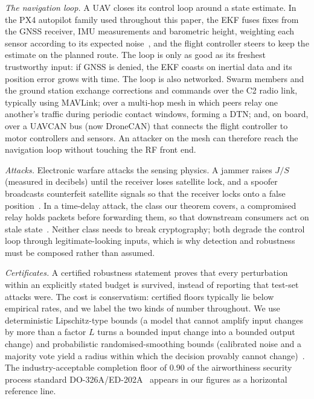\documentclass[conference,letterpaper,10pt]{IEEEtran}   %
\begin{document}
\emph{The navigation loop.} A UAV closes its control loop around a state
estimate. In the PX4 autopilot family used throughout this paper, the EKF
fuses fixes from the GNSS receiver, IMU measurements and barometric height,
weighting
each sensor according to its expected noise~\cite{kong2024px4ekf}, and the
flight controller steers to keep the estimate on the planned route. The loop is
only as good as its freshest trustworthy input: if GNSS is denied, the EKF
coasts on inertial data and its position error grows with time. The loop is
also networked. Swarm members and the ground station exchange corrections and
commands over the C2 radio link, typically using MAVLink;
over a multi-hop mesh in which peers relay one another's traffic during
periodic contact windows, forming a DTN; and, on board,
over a UAVCAN bus (now DroneCAN) that connects the flight controller to motor
controllers and sensors. An attacker on the mesh can therefore reach the
navigation loop without touching the RF front end.

\emph{Attacks.} Electronic warfare attacks the sensing physics. A jammer
raises $J/S$ (measured in decibels) until the
receiver loses satellite lock, and a spoofer broadcasts counterfeit satellite
signals so that the receiver locks onto a false
position~\cite{humphreys2008assessing,kerns2014capture}. In a time-delay
attack, the class our theorem covers, a compromised relay holds packets before
forwarding them, so that downstream consumers act on stale
state~\cite{lou2019timedelay,datamut2026}. Neither class needs to break
cryptography; both degrade the control loop through legitimate-looking inputs,
which is why detection and robustness must be composed rather than assumed.

\emph{Certificates.} A certified robustness statement proves that every
perturbation within an explicitly stated budget is survived, instead of
reporting that test-set attacks were. The cost is conservatism: certified
floors typically lie below empirical rates, and we label the two kinds of
number throughout. We use deterministic Lipschitz-type bounds (a model that
cannot amplify input changes by more than a factor $L$ turns a bounded input
change into a bounded output change) and probabilistic randomised-smoothing
bounds (calibrated noise and a majority vote yield a radius within which the
decision provably cannot change)~\cite{cohen2019smoothing}. The
industry-acceptable completion floor of $0.90$ of the airworthiness security
process standard DO-326A/ED-202A~\cite{do326a} appears in our figures as a
horizontal reference line.
\end{document}
